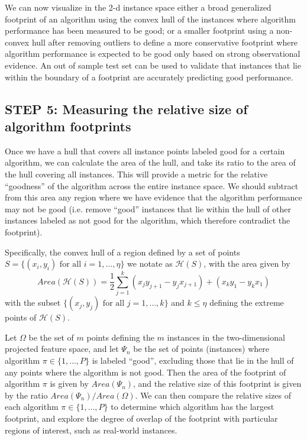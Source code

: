 \documentclass[conference]{IEEEtran}
\begin{document}
We can now visualize in the 2-d instance space either a broad generalized footprint of an algorithm using the convex hull of the instances where algorithm performance has been measured to be good; or a smaller footprint using a non-convex hull after removing outliers to define a more conservative footprint where algorithm performance is expected to be good only based on strong observational evidence. An out of sample test set can be used to validate that instances that lie within the boundary of a footprint are accurately predicting good performance.

\subsection{STEP 5: Measuring the relative size of algorithm footprints}
Once we have a hull that covers all instance points labeled good for a certain algorithm, we can calculate the area of the hull, and take its ratio to the area of the hull covering all instances. This will provide a metric for the relative “goodness” of the algorithm across the entire instance space. We should subtract from this area any region where we have evidence that the algorithm performance may not be good (i.e. remove “good” instances that lie within the hull of other instances labeled as not good for the algorithm, which therefore contradict the footprint).

Specifically, the convex hull of a region defined by a set of points $S = \{(x_i, y_i)\text{ for all }i = 1, \ldots, \eta\}$ we notate as $\mathcal{H}(S)$, with the area given by
\begin{displaymath}
Area(\mathcal{H}(S)) = \frac{1}{2} \sum_{j = 1}^{k} (x_j y_{j+1} - y_j x_{j+1}) + (x_k y_1 - y_k x_1)
\end{displaymath}
with the subset $\{(x_j, y_j)\text{ for all } j = 1, \ldots, k\}$ and $k \le \eta$ defining the extreme points of $\mathcal{H}(S)$.

Let $\Omega$ be the set of $m$ points defining the $m$ instances in the two-dimensional projected feature space, and let $\Psi_n$ be the set of points (instances) where algorithm $\pi \in \{1, \ldots, P\}$ is labeled ``good'', excluding those that lie in the hull of any points where the algorithm is not good. Then the area of the footprint of algorithm $\pi$ is given by $Area(\Psi_n)$, and the relative size of this footprint is given by the ratio $Area(\Psi_n)/Area(\Omega)$. We can then compare the relative sizes of each algorithm $\pi \in \{1, \ldots, P\}$ to determine which algorithm has the largest footprint, and explore the degree of overlap of the footprint with particular regions of interest, such as real-world instances.
\end{document}
